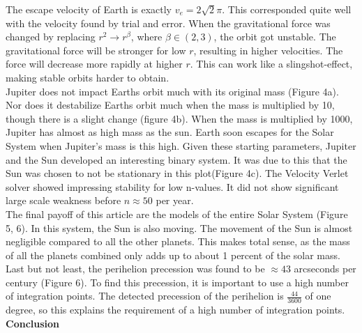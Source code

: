 \documentclass[10pt,a4paper]{article}
\begin{document}
\noindent The escape velocity of Earth is exactly $v_e=2\sqrt{2}\pi$. This corresponded quite well with the velocity found by trial and error. When the gravitational force was changed by replacing $r^2\rightarrow r^\beta$, where $\beta \in(2,3)$, the orbit got unstable. The gravitational force will be stronger for low $r$, resulting in higher velocities. The force will decrease more rapidly at higher $r$. This can work like a slingshot-effect, making stable orbits harder to obtain.\\


\noindent Jupiter does not impact Earths orbit much with its original mass (Figure 4a). Nor does it destabilize Earths orbit much when the mass is multiplied by 10, though there is a slight change (figure 4b). When the mass is multiplied by 1000, Jupiter has almost as high mass as the sun. Earth soon escapes for the Solar System when Jupiter's mass is this high. Given these starting parameters, Jupiter and the Sun developed an interesting binary system. It was due to this that the Sun was chosen to not be stationary in this plot(Figure 4c). The Velocity Verlet solver showed impressing stability for low n-values. It did not show significant large scale weakness before $n\approx 50$ per year.\\

\noindent The final payoff of this article are the models of the entire Solar System (Figure 5, 6). In this system, the Sun is also moving. The movement of the Sun is almost negligible compared to all the other planets. This makes total sense, as the mass of all the planets combined only adds up to about 1 percent of the solar mass.\\ 

\noindent Last but not least, the perihelion precession was found to be $\approx 43$ arcseconds per century (Figure 6). To find this precession, it is important to use a high number of integration points. The detected precession of the perihelion is $\frac{44}{3600}$ of one degree, so this explains the requirement of a high number of integration points. \\






\newpage
{\LARGE\bf
Conclusion
}\\
\end{document}
